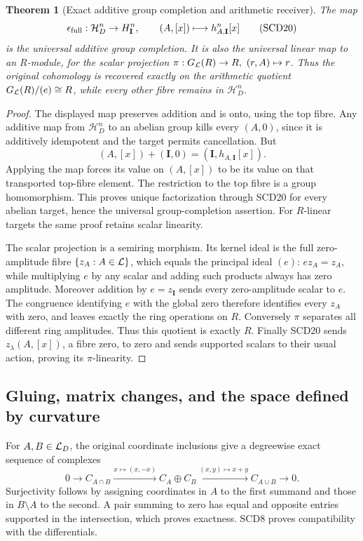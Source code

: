 \documentclass[11pt,a4paper]{article}
\newtheorem{theorem}{Theorem}[section]
\theoremstyle{definition}\newtheorem{definition}[theorem]{Definition}
\begin{document}
\begin{theorem}[Exact additive group completion and arithmetic receiver]
The map
\[
 \epsilon_{\rm full}:\mathcal H_D^n\to H_{\mathbf I}^n,\qquad
 (A,[x])\longmapsto h_{A,\mathbf I}^n[x]
 \tag{SCD20}
\]
is the universal additive group completion. It is also the universal
linear map to an \(R\)-module, for the scalar projection
\(\pi:G_{\mathcal L}(R)\to R,\ (r,A)\mapsto r\).
Thus the original cohomology is recovered exactly on the arithmetic
quotient \(G_{\mathcal L}(R)/(e)\cong R\), while every other fibre remains
in \(\mathcal H_D^n\).
\end{theorem}
\begin{proof}
The displayed map preserves addition and is onto, using the top
fibre. Any additive map from \(\mathcal H_D^n\) to an abelian group
kills every \((A,0)\), since it is additively idempotent and the
target permits cancellation. But
\[
 (A,[x])+(\mathbf I,0)
 =(\mathbf I,h_{A,\mathbf I}[x]).
\]
Applying the map forces its value on \((A,[x])\) to be its value
on that transported top-fibre element. The restriction to the
top fibre is a group homomorphism. This proves unique factorization
through SCD20 for every abelian target, hence the universal
group-completion assertion. For \(R\)-linear targets the same proof
retains scalar linearity.

The scalar projection is a semiring morphism. Its kernel ideal
is the full zero-amplitude fibre \(\{z_A:A\in\mathcal L\}\), which equals
the principal ideal \((e)\): \(ez_A=z_A\), while multiplying \(e\)
by any scalar and adding such products always has zero amplitude.
Moreover addition by \(e=z_{\mathbf I}\) sends every zero-amplitude
scalar to \(e\). The congruence identifying \(e\) with the global
zero therefore identifies every \(z_A\) with zero, and leaves
exactly the ring operations on \(R\). Conversely \(\pi\) separates
all different ring amplitudes. Thus this quotient is exactly \(R\).
Finally SCD20 sends \(z_\lambda(A,[x])\), a fibre zero, to zero
and sends supported scalars to their usual action, proving its
\(\pi\)-linearity.
\end{proof}

\subsection{Gluing, matrix changes, and the space defined by curvature}

For \(A,B\in\mathcal L_D\), the original coordinate inclusions give
a degreewise exact sequence of complexes
\[
 0\to C_{A\cap B}\xrightarrow{x\mapsto(x,-x)}
 C_A\oplus C_B\xrightarrow{(x,y)\mapsto x+y}C_{A\cup B}\to0 .
 \tag{SCD21}
\]
Surjectivity follows by assigning coordinates in \(A\) to the first
summand and those in \(B\setminus A\) to the second. A pair summing
to zero has equal and opposite entries supported in the intersection,
which proves exactness. SCD8 proves compatibility with the differentials.
\end{document}
